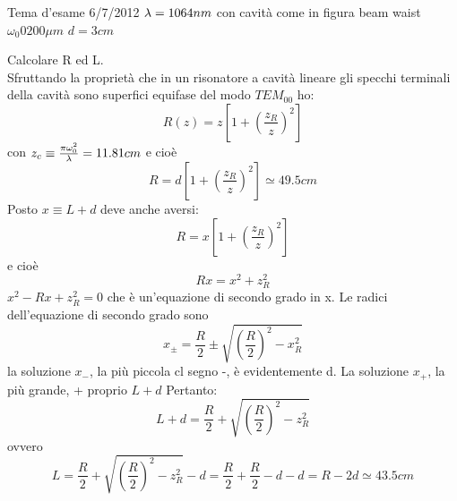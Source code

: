 Tema d'esame 6/7/2012
$\lambda = 1064 nm$ con cavità come in figura
beam waist $\omega_0 0 200 \mu m$ $d = 3cm$

Calcolare R ed L.\\
Sfruttando la proprietà che in un risonatore a cavità lineare gli specchi terminali della cavità sono superfici equifase del modo $TEM_{00}$ ho:
\begin{equation*}
R(z) = z \left[1+\left(\frac{z_R}{z}\right)^2 \right]
\end{equation*}
con $z_c \equiv \frac{\pi \omega_0^2}{\lambda} = 11.81 cm$
e cioè
\begin{equation*}
R = d \left[1+\left(\frac{z_R}{z}\right)^2 \right] \simeq 49.5 cm
\end{equation*}
Posto $x \equiv L + d$ deve anche aversi:
\begin{equation*}
R = x \left[1+\left(\frac{z_R}{z}\right)^2 \right] 
\end{equation*}
e cioè
\begin{equation*}
R x = x^2 + z_R^2
\end{equation*}
$x^2 -R x + z_R^2 = 0$ che è un'equazione di secondo grado in x.
Le radici dell'equazione di secondo grado sono
\begin{equation*}
x_\pm = \frac{R}{2} \pm \sqrt{\left(\frac{R}{2}\right)^2 - x_R^2}
\end{equation*}
la soluzione $x_-$, la più piccola cl segno -, è evidentemente d.
La soluzione $x_+$, la più grande, + proprio $L + d$
Pertanto:
\begin{equation*}
L + d = \frac{R}{2} + \sqrt{\left(\frac{R}{2}\right)^2 - z_R^2}
\end{equation*}
ovvero
\begin{equation*}
L = \frac{R}{2} + \sqrt{\left(\frac{R}{2}\right)^2 - z_R^2} - d = \frac{R}{2} + \frac{R}{2} - d - d = R - 2d \simeq 43.5 cm
\end{equation*}
